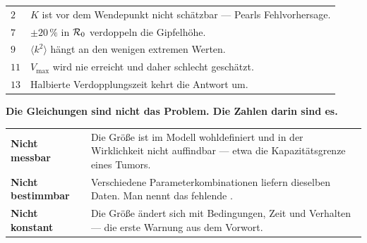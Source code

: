 \begin{warnung}
\begin{center}
{\small
\renewcommand{\arraystretch}{1.5}
\begin{tabular}{@{}P{1.8cm}P{6.2cm}@{}}
\toprule
$2$ & $K$ ist vor dem Wendepunkt nicht schätzbar --- Pearls Fehlvorhersage.\\
$7$ & $\pm20\,\%$ in $\mathcal{R}_0$ verdoppeln die Gipfelhöhe.\\
$9$ & $\langle k^2\rangle$ hängt an den wenigen extremen Werten.\\
$11$ & $V_{\max}$ wird nie erreicht und daher schlecht geschätzt.\\
$13$ & Halbierte Verdopplungszeit kehrt die Antwort um.\\
\bottomrule
\end{tabular}}
\end{center}

\begin{center}
\begin{minipage}{0.9\textwidth}
\textbf{Die Gleichungen sind nicht das Problem. Die Zahlen darin sind es.}
\end{minipage}
\end{center}

\begin{center}
{\small
\renewcommand{\arraystretch}{1.5}
\begin{tabular}{@{}P{3.0cm}P{5.6cm}@{}}
\toprule
\textbf{Nicht messbar} & Die Größe ist im Modell wohldefiniert und in der Wirklichkeit nicht auffindbar --- etwa die Kapazitätsgrenze eines Tumors.\\
\textbf{Nicht bestimmbar} & Verschiedene Parameterkombinationen liefern dieselben Daten. Man nennt das fehlende .\\
\textbf{Nicht konstant} & Die Größe ändert sich mit Bedin\-gungen, Zeit und Verhalten --- die erste Warnung aus dem Vorwort.\\
\bottomrule
\end{tabular}}
\end{center}

\begin{center}
\begin{minipage}{0.88\textwidth}
\end{minipage}
\end{center}
\end{warnung}

